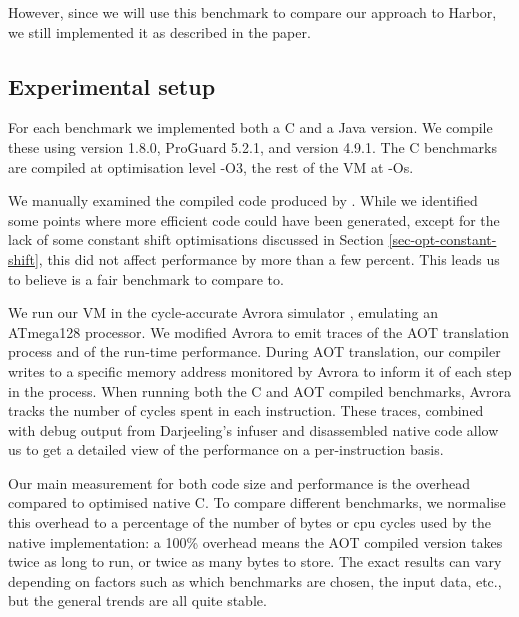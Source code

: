 However, since we will use this benchmark to compare our approach to Harbor, we still implemented it as described in the paper.

\subsection{Experimental setup}
For each benchmark we implemented both a C and a Java version. We compile these using  version 1.8.0, ProGuard 5.2.1, and  version 4.9.1. The C benchmarks are compiled at optimisation level -O3, the rest of the VM at -Os.

We manually examined the compiled code produced by . While we identified some points where more efficient code could have been generated, except for the lack of some constant shift optimisations discussed in Section \ref{sec-opt-constant-shift}, this did not affect performance by more than a few percent. This leads us to believe  is a fair benchmark to compare to.

We run our VM in the cycle-accurate Avrora simulator \cite{Titzer:2005vb}, emulating an ATmega128 processor. We modified Avrora to emit traces of the AOT translation process and of the run-time performance. During AOT translation, our compiler writes to a specific memory address monitored by Avrora to inform it of each step in the process. When running both the C and AOT compiled benchmarks, Avrora tracks the number of cycles spent in each instruction. These traces, combined with debug output from Darjeeling's infuser and disassembled native code allow us to get a detailed view of the performance on a per-instruction basis.

Our main measurement for both code size and performance is the overhead compared to optimised native C. To compare different benchmarks, we normalise this overhead to a percentage of the number of bytes or cpu cycles used by the native implementation: a 100\% overhead means the AOT compiled version takes twice as long to run, or twice as many bytes to store. The exact results can vary depending on factors such as which benchmarks are chosen, the input data, etc., but the general trends are all quite stable.
